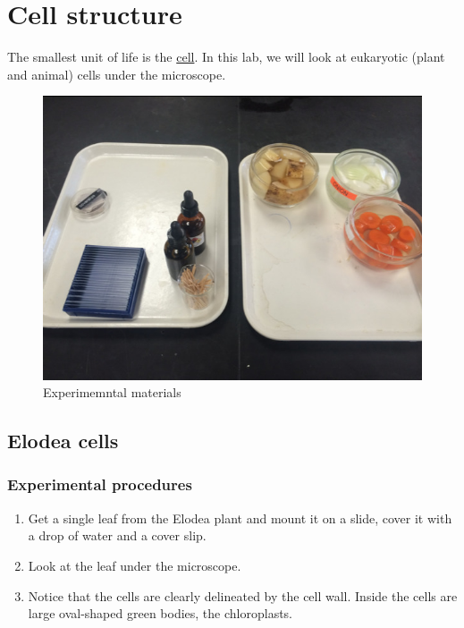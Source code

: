 \chapter{Cell structure}\label{cell-structure}

The smallest unit of life is the
\href{https://en.wikipedia.org/wiki/Cell_(biology)}{cell}. In this lab,
we will look at eukaryotic (plant and animal) cells under the
microscope.

\begin{figure}

{\centering \includegraphics[width=0.7\linewidth]{./figures/cell_struc/materials}

}

\caption{Experimemntal materials}\label{fig:materials}
\end{figure}

\section{Elodea cells}\label{elodea-cells}

\subsection{Experimental procedures}\label{experimental-procedures-7}

\begin{enumerate}
\def\labelenumi{\arabic{enumi}.}
\tightlist
\item
  Get a single leaf from the Elodea plant and mount it on a slide, cover
  it with a drop of water and a cover slip.
\item
  Look at the leaf under the microscope.
\item
  Notice that the cells are clearly delineated by the cell wall. Inside
  the cells are large oval-shaped green bodies, the chloroplasts.
\end{enumerate}


